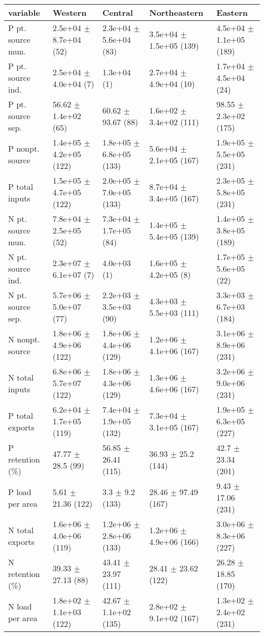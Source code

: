 \documentclass{article}
\begin{document}
\begin{landscape}
\begin{table}[!h]
\centering
\begin{tabular}{lllll}
\toprule
variable & Western & Central & Northeastern & Eastern\\
\midrule
P pt. source mun. & 2.5e+04 $\pm$ 8.7e+04 (52) & 2.3e+04 $\pm$ 5.6e+04 (83) & 3.5e+04 $\pm$ 1.5e+05 (139) & 4.5e+04 $\pm$ 1.1e+05 (189)\\
P pt. source ind. & 2.5e+04 $\pm$ 4.0e+04 (7) & 1.3e+04 (1) & 2.7e+04 $\pm$ 4.9e+04 (10) & 1.7e+04 $\pm$ 4.5e+04 (24)\\
P pt. source sep. & 56.62 $\pm$ 1.4e+02 (65) & 60.62 $\pm$ 93.67 (88) & 1.6e+02 $\pm$ 3.4e+02 (111) & 98.55 $\pm$ 2.3e+02 (175)\\
P nonpt. source & 1.4e+05 $\pm$ 4.2e+05 (122) & 1.8e+05 $\pm$ 6.8e+05 (133) & 5.6e+04 $\pm$ 2.1e+05 (167) & 1.9e+05 $\pm$ 5.5e+05 (231)\\
P total inputs & 1.5e+05 $\pm$ 4.7e+05 (122) & 2.0e+05 $\pm$ 7.0e+05 (133) & 8.7e+04 $\pm$ 3.4e+05 (167) & 2.3e+05 $\pm$ 5.8e+05 (231)\\
\addlinespace
N pt. source mun. & 7.8e+04 $\pm$ 2.5e+05 (52) & 7.3e+04 $\pm$ 1.7e+05 (84) & 1.4e+05 $\pm$ 5.4e+05 (139) & 1.4e+05 $\pm$ 3.8e+05 (189)\\
N pt. source ind. & 2.3e+07 $\pm$ 6.1e+07 (7) & 4.0e+03 (1) & 1.6e+05 $\pm$ 4.2e+05 (8) & 1.7e+05 $\pm$ 5.6e+05 (22)\\
N pt. source sep. & 5.7e+06 $\pm$ 5.0e+07 (77) & 2.2e+03 $\pm$ 3.5e+03 (90) & 4.3e+03 $\pm$ 5.5e+03 (111) & 3.3e+03 $\pm$ 6.7e+03 (184)\\
N nonpt. source & 1.8e+06 $\pm$ 4.9e+06 (122) & 1.8e+06 $\pm$ 4.4e+06 (129) & 1.2e+06 $\pm$ 4.1e+06 (167) & 3.1e+06 $\pm$ 8.9e+06 (231)\\
N total inputs & 6.8e+06 $\pm$ 5.7e+07 (122) & 1.8e+06 $\pm$ 4.3e+06 (129) & 1.3e+06 $\pm$ 4.6e+06 (167) & 3.2e+06 $\pm$ 9.0e+06 (231)\\
\addlinespace
P total exports & 6.2e+04 $\pm$ 1.7e+05 (119) & 7.4e+04 $\pm$ 1.9e+05 (132) & 7.3e+04 $\pm$ 3.1e+05 (167) & 1.9e+05 $\pm$ 6.3e+05 (227)\\
P retention (\%) & 47.77 $\pm$ 28.5 (99) & 56.85 $\pm$ 26.41 (115) & 36.93 $\pm$ 25.2 (144) & 42.7 $\pm$ 23.34 (201)\\
P load per area & 5.61 $\pm$ 21.36 (122) & 3.3 $\pm$ 9.2 (133) & 28.46 $\pm$ 97.49 (167) & 9.43 $\pm$ 17.06 (231)\\
N total exports & 1.6e+06 $\pm$ 4.0e+06 (119) & 1.2e+06 $\pm$ 2.8e+06 (133) & 1.2e+06 $\pm$ 4.9e+06 (166) & 3.0e+06 $\pm$ 8.3e+06 (227)\\
N retention (\%) & 39.33 $\pm$ 27.13 (88) & 43.41 $\pm$ 23.97 (111) & 28.41 $\pm$ 23.62 (122) & 26.28 $\pm$ 18.85 (170)\\
N load per area & 1.8e+02 $\pm$ 1.1e+03 (122) & 42.67 $\pm$ 1.1e+02 (135) & 2.8e+02 $\pm$ 9.1e+02 (167) & 1.3e+02 $\pm$ 2.4e+02 (231)\\
\bottomrule
\end{tabular}
\end{table}
\end{landscape}
\end{document}
